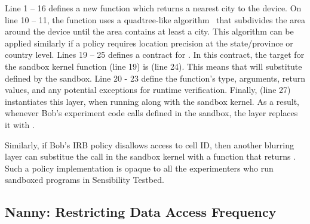 Line 1 -- 16 defines a new function  which returns 
a nearest city to the device. On line 10 -- 11, the function 
uses a quadtree-like algorithm~\cite{gruteser2003anonymous} that subdivides 
the area around the device until the area contains at least a city.
This algorithm can be applied similarly if a policy requires location 
precision at the state/province or country level.
Lines 19 -- 25 defines a contract for . 
In this contract, the target for the sandbox kernel function 
 (line 19) is  (line 24).
This means that  will substitute  
 defined by the sandbox.
Line 20 - 23 define the function's type, arguments,
return values, and any potential exceptions for runtime verification. 
Finally,  (line 27) instantiates this
 layer, when running along with the sandbox kernel. 
As a result, 
whenever Bob's experiment code calls  defined in the sandbox, 
the  layer replaces it with . 

Similarly, if Bob's IRB policy disallows access to cell ID, then another blurring layer 
can substitue the  call in the sandbox kernel with a function that
returns . %
Such a policy implementation is opaque to all the experimenters who run 
sandboxed programs in Sensibility Testbed.

\subsection{Nanny: Restricting Data Access Frequency}\label{sec-nanny}

